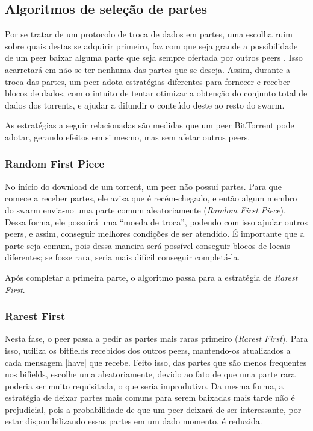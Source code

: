 
\newpage
\subsection*{Algoritmos de seleção de partes}

Por se tratar de um protocolo de troca de dados em partes, uma escolha ruim sobre quais
destas se adquirir primeiro, faz com que seja grande a possibilidade de um \gls*{peer}
baixar alguma parte que seja sempre ofertada por outros \glspl*{peer}
\cite{artigo:bittorrent}. Isso acarretará em não se ter nenhuma das partes que se
deseja. Assim, durante a troca das partes, um \gls*{peer} adota estratégias diferentes
para fornecer e receber blocos de dados, com o intuito de tentar otimizar a obtenção do
conjunto total de dados dos \glspl*{torrent}, e ajudar a difundir o conteúdo deste ao
resto do \gls*{swarm}.

As estratégias a seguir relacionadas são medidas que um \gls*{peer} BitTorrent pode
adotar, gerando efeitos em si mesmo, mas sem afetar outros \glspl*{peer}.

\subsubsection*{Random First Piece}

No início do download de um \gls*{torrent}, um \gls*{peer} não possui partes. Para que
comece a receber partes, ele avisa que é recém-chegado, e então algum membro do
\gls*{swarm} envia-no uma parte comum aleatoriamente (\emph{Random First Piece}). Dessa
forma, ele possuirá uma ``moeda de troca'', podendo com isso ajudar outros \glspl*{peer},
e assim, conseguir melhores condições de ser atendido. É importante que a parte seja
comum, pois dessa maneira será possível conseguir blocos de locais diferentes; se fosse
rara, seria mais difícil conseguir completá-la.

Após completar a primeira parte, o algoritmo passa para a estratégia de \emph{Rarest
First}.

\subsubsection*{Rarest First}

Nesta fase, o \gls*{peer} passa a pedir as partes mais raras primeiro
(\emph{Rarest First}). Para isso, utiliza os bitfields recebidos dos outros
\glspl*{peer}, mantendo-os atualizados a cada mensagem \bverb|have| que recebe. Feito
isso, das partes que são menos frequentes nos bifields, escolhe uma aleatoriamente,
devido ao fato de que uma parte rara poderia ser muito requisitada, o que seria
improdutivo. Da mesma forma, a estratégia de deixar partes mais comuns para serem
baixadas mais tarde não é prejudicial, pois a probabilidade de que um \gls*{peer}
deixará de ser interessante, por estar disponibilizando essas partes em um dado
momento, é reduzida.

